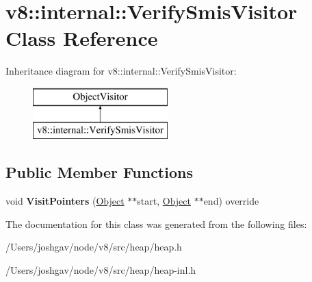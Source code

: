 \hypertarget{classv8_1_1internal_1_1_verify_smis_visitor}{}\section{v8\+:\+:internal\+:\+:Verify\+Smis\+Visitor Class Reference}
\label{classv8_1_1internal_1_1_verify_smis_visitor}
Inheritance diagram for v8\+:\+:internal\+:\+:Verify\+Smis\+Visitor\+:\begin{figure}[H]
\begin{center}
\leavevmode
\includegraphics[height=2.000000cm]{classv8_1_1internal_1_1_verify_smis_visitor}
\end{center}
\end{figure}
\subsection*{Public Member Functions}
\begin{DoxyCompactItemize}
\item 
void {\bfseries Visit\+Pointers} (\hyperlink{classv8_1_1internal_1_1_object}{Object} $\ast$$\ast$start, \hyperlink{classv8_1_1internal_1_1_object}{Object} $\ast$$\ast$end) override\hypertarget{classv8_1_1internal_1_1_verify_smis_visitor_a9dbac54746989715827268a2f04de363}{}\label{classv8_1_1internal_1_1_verify_smis_visitor_a9dbac54746989715827268a2f04de363}

\end{DoxyCompactItemize}


The documentation for this class was generated from the following files\+:\begin{DoxyCompactItemize}
\item 
/\+Users/joshgav/node/v8/src/heap/heap.\+h\item 
/\+Users/joshgav/node/v8/src/heap/heap-\/inl.\+h\end{DoxyCompactItemize}
